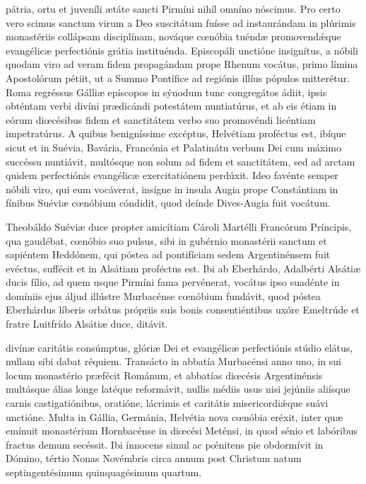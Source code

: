 \documentclass[fontsize=9pt,paper=A6,twoside,BCOR=1mm,DIV=22,headinclude]{scrarticle}
\begin{document}
\begin{multicols}{2}
{}

{
 pátria, ortu et juveníli ætáte sancti Pirmíni nihíl omníno nóscimus. Pro certo vero scimus sanctum virum a Deo suscitátum fuísse ad instaurándam in plúrimis monastériis collápsam disciplínam, nováque cœnóbia tuéndæ promovend\'æque evangélicæ perfectiónis grátia instituénda. Episcopáli unctióne insignítus, a nóbili quodam viro ad veram fidem propagándam prope Rhenum vocátus, primo límina Apostolórum pétiit, ut a Summo Pontífice ad regiónis illíus pópulos mitterétur. Roma regréssus Gálliæ epíscopos in sýnodum tunc congregátos ádiit, ipsis obténtam verbi divíni prædicándi potestátem nuntiatúrus, et ab eis étiam in eórum diœcésibus fidem et sanctitátem verbo suo promovéndi licéntiam impetratúrus. A quibus benigníssime excéptus, Helvétiam proféctus est, ibíque sicut et in Suévia, Bavária, Francónia et Palatinátu verbum Dei cum máximo succéssu nuntiávit, multósque non solum ad fidem et sanctitátem, sed ad arctam quidem perfectiónis evangélicæ exercitatiónem perdúxit. Ideo favénte semper nóbili viro, qui eum vocáverat, insígne in insula Augia prope Constántiam in fínibus Suéviæ cœnóbium cóndidit, quod deínde Dives-Augia fuit vocátum.

\RVCPiv 

 Theobáldo Suéviæ duce propter amicítiam Cároli Martélli Francórum Príncipis, qua gaudébat, cœnóbio suo pulsus, sibi in gubérnio monastérii sanctum et sapiéntem Heddónem, qui póstea ad pontifíciam sedem Argentinénsem fuit evéctus, suffécit et in Alsátiam proféctus est. Ibi ab Eberhárdo, Adalbérti Alsátiæ ducis fílio, ad quem usque Pirmíni fama pervénerat, vocátus ipso suadénte in domíniis ejus áljud illústre Murbacénse cœnóbium fundávit, quod póstea Eberhárdus líberis orbátus própriis suis bonis consentiéntibus uxóre Emeltrúde et fratre Luitfrído Alsátiæ duce, ditávit.

\RVCPv 

 divínæ caritátis consúmptus, glóriæ Dei et evangélicæ perfectiónis stúdio elátus, nullam sibi dabat réquiem. Transácto in abbatía Murbacénsi anno uno, in sui locum monastério præfécit Románum, et abbatías diœcésis Argentinénsis multásque álias longe latéque reformávit, nullis médiis usus nisi jejúniis aliísque carnis castigatiónibus, oratióne, lácrimis et caritátis misericordi\'æque suávi unctióne. Multa in Gállia, Germánia, Helvétia nova cœnóbia eréxit, inter quæ emínuit monastérium Hornbacénse in diœcési Meténsi, in quod sénio et labóribus fractus demum secéssit. Ibi ínnocens simul ac p\'œnitens pie obdormívit in Dómino, tértio Nonas Novémbris circa annum post Christum natum septingentésimum quinquagésimum quartum.

}
\end{multicols}
\end{document}
